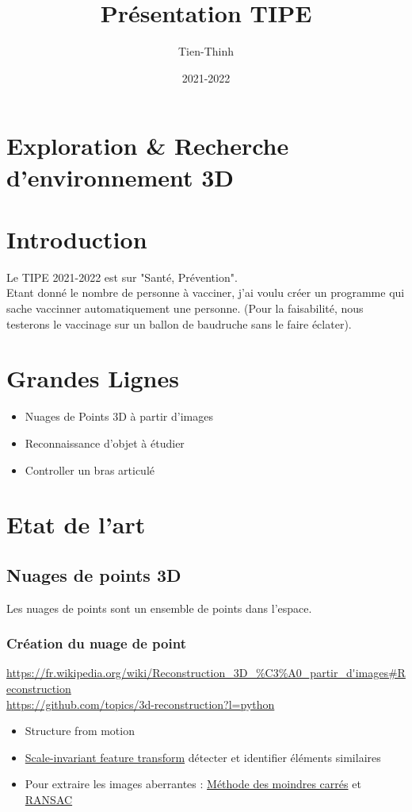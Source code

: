 \documentclass[12pt,a4paper]{article}
\author{Tien-Thinh}
\title{Présentation TIPE}
\date{2021-2022}
\begin{document}
\maketitle
\section*{Exploration \& Recherche d'environnement 3D}

\section{Introduction}
Le TIPE 2021-2022 est sur "Santé, Prévention". \\
Etant donné le nombre de personne à vacciner, j'ai voulu créer un programme qui sache vaccinner automatiquement une personne. (Pour la faisabilité, nous testerons le vaccinage sur un ballon de baudruche sans le faire éclater).

\section{Grandes Lignes}
\begin{itemize}
\item Nuages de Points 3D à partir d'images
\item Reconnaissance d'objet à étudier 
\item Controller un bras articulé
\end{itemize} 

\section{Etat de l'art}
\subsection{Nuages de points 3D}
Les nuages de points sont un ensemble de points dans l'espace. 

\subsubsection{Création du nuage de point}
\url{https://fr.wikipedia.org/wiki/Reconstruction_3D_%C3%A0_partir_d'images#Reconstruction} \\
\url{https://github.com/topics/3d-reconstruction?l=python} \\
\begin{itemize}
\item Structure from motion
\item \href{https://fr.wikipedia.org/wiki/Scale-invariant_feature_transform}{Scale-invariant feature transform} détecter et identifier éléments similaires
\item Pour extraire les images aberrantes : \href{https://fr.wikipedia.org/wiki/M%C3%A9thode_des_moindres_carr%C3%A9s}{Méthode des moindres carrés} et \href{https://fr.wikipedia.org/wiki/RANSAC}{RANSAC}
\end{itemize}
\end{document}
